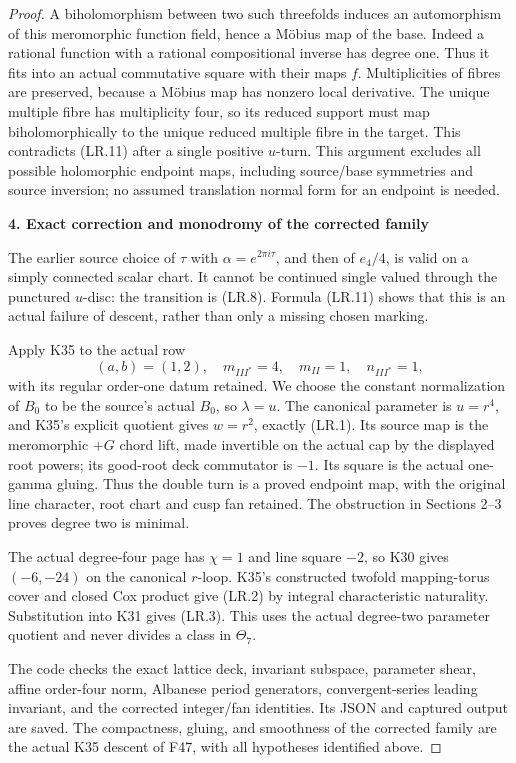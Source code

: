 \begin{proof}
A biholomorphism between two such threefolds induces an automorphism
of this meromorphic function field, hence a Möbius map of the base.
Indeed a rational function with a rational compositional inverse
has degree one. Thus it fits into an actual commutative square with
their maps \(f\). Multiplicities of fibres are preserved, because a
Möbius map has nonzero local derivative. The unique multiple fibre
has multiplicity four, so its reduced support must map biholomorphically
to the unique reduced multiple fibre in the target. This contradicts
(LR.11) after a single positive \(u\)-turn. This argument excludes
all possible holomorphic endpoint maps, including source/base
symmetries and source inversion; no assumed translation normal form
for an endpoint is needed.

\par

\medskip\noindent\textbf{4. Exact correction and monodromy of the corrected family}

\par\nobreak

The earlier source choice of \(\tau\) with
\(\alpha=e^{2\pi i\tau}\), and then of \(e_4/4\), is valid on a
simply connected scalar chart. It cannot be continued single valued
through the punctured \(u\)-disc: the transition is (LR.8). Formula
(LR.11) shows that this is an actual failure of descent, rather than
only a missing chosen marking.

Apply K35 to the actual row
\[
 (a,b)=(1,2),\quad m_{III^*}=4,\quad m_{II}=1,
 \quad n_{III^*}=1,
\]
with its regular order-one datum retained. We choose the constant
normalization of \(B_0\) to be the source's actual \(B_0\), so
\(\lambda=u\). The canonical parameter is \(u=r^4\), and K35's
explicit quotient gives \(w=r^2\), exactly (LR.1). Its source map is
the meromorphic \(+G\) chord lift, made invertible on the actual
cap by the displayed root powers; its good-root deck commutator is
\(-1\). Its square is the actual one-gamma gluing. Thus the double
turn is a proved endpoint map, with the original line character,
root chart and cusp fan retained. The obstruction in Sections 2--3
proves degree two is minimal.

The actual degree-four page has \(\chi=1\) and line square \(-2\),
so K30 gives \((-6,-24)\) on the canonical \(r\)-loop. K35's
constructed twofold mapping-torus cover and closed Cox product give
(LR.2) by integral characteristic naturality. Substitution into K31
gives (LR.3). This uses the actual degree-two parameter quotient and
never divides a class in \(\Theta_7\).

The code  checks the exact
lattice deck, invariant subspace, parameter shear, affine order-four
norm, Albanese period generators, convergent-series leading invariant,
and the corrected integer/fan identities. Its JSON and captured output
are saved. The compactness, gluing, and smoothness of the corrected
family are the actual K35 descent of F47, with all hypotheses identified
above.

\end{proof}
